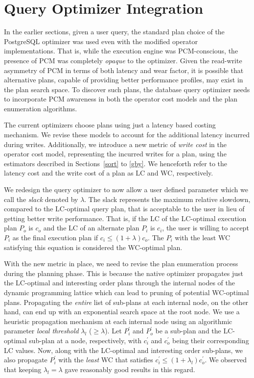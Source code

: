 \section{Query Optimizer Integration}
\label{discussion}

In the earlier sections, given a user query, the standard plan choice
of the PostgreSQL optimizer was used even with the modified operator
implementations. That is, while the execution engine was PCM-conscious,
the presence of PCM was completely \emph{opaque} to the optimizer.
Given the read-write asymmetry of PCM in terms of both latency and wear
factor, it is possible that alternative plans, capable of providing better
performance profiles, may exist in the plan search space. To discover
such plans, the database query optimizer needs to incorporate PCM
awareness in both the operator cost models and the plan enumeration
algorithms.

The current optimizers choose plans using just a latency based costing mechanism. We revise these models to account for the additional latency incurred during writes. Additionally, we introduce a new metric of \emph{write cost} in the operator cost model, representing the incurred writes for a plan, using the estimators described in Sections~\ref{sort} to \ref{gby}. We henceforth refer to the latency cost and the write cost of a plan as LC and WC, respectively. 

We redesign the query optimizer to now allow a user defined parameter which we call the \emph{slack} denoted by $\lambda$. The slack represents the maximum relative slowdown, compared to the LC-optimal query plan, that is acceptable to the user in lieu of getting better write performance. That is, if the LC of the LC-optimal execution plan $P_o$ is $c_o$ and the LC of an alternate plan $P_i$ is $c_i$, the user is willing to accept $P_i$ as the final execution plan if $c_i \le (1+\lambda) c_o$. The $P_i$ with the least WC satisfying this equation is considered the WC-optimal plan.

With the new metric in place, we need to revise the plan enumeration process during the planning phase. This is because the native optimizer propagates just the LC-optimal and interesting order plans through the internal nodes of the dynamic programming lattice which can lead to pruning of potential WC-optimal plans. Propagating the \emph{entire} list of sub-plans at each internal node, on the other hand, can end up with an exponential search space at the root node. We use a heuristic propagation mechanism at each internal node using an algorithmic parameter \emph{local threshold} $\lambda_l$ ($\ge\lambda$). Let  $P_i^'$ and $P_o^'$ be a sub-plan and the LC-optimal sub-plan at a node, respectively, with $c_i^'$ and $c_o^'$ being their corresponding LC values. Now, along with the LC-optimal and interesting order sub-plans, we also propagate $P_i^'$ with the \emph{least} WC that satisfies $c_i^{'} \le (1+\lambda_l) c_o^{'}$. We observed that keeping $\lambda_l = \lambda$ gave reasonably good results in this regard.

